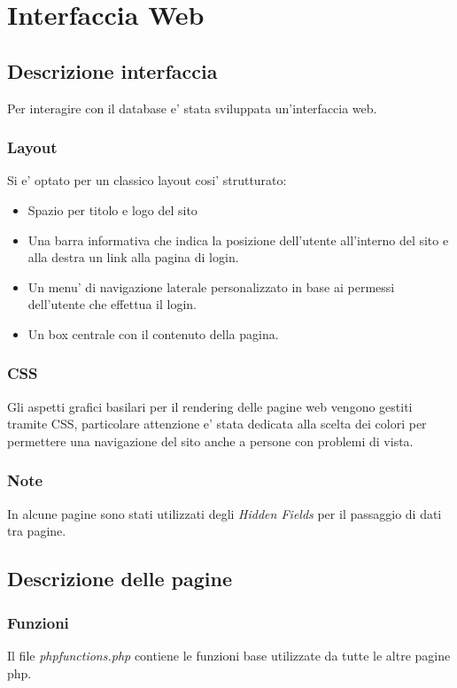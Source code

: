 \chapter{Interfaccia Web} 
 
\section{Descrizione interfaccia}

Per interagire con il database e' stata sviluppata un'interfaccia web.

\subsection{Layout}
Si e' optato per un classico layout cosi' strutturato:

\begin{itemize}
\item Spazio per titolo e logo del sito
\item Una barra informativa che indica la posizione dell'utente all'interno del sito e alla destra un link alla pagina di login.
\item Un menu' di navigazione laterale personalizzato in base ai permessi dell'utente che effettua il login.
\item Un box centrale con il contenuto della pagina.
\end{itemize}

\subsection{CSS}

Gli aspetti grafici basilari per il rendering delle pagine web vengono gestiti tramite CSS, particolare attenzione e' stata dedicata alla scelta dei colori per permettere una navigazione del sito anche a persone con problemi di vista.

\subsection{Note}
In alcune pagine sono stati utilizzati degli \textit{Hidden Fields} per il passaggio di dati tra pagine.

\section{Descrizione delle pagine}

\subsection{Funzioni}
Il file \textit{phpfunctions.php} contiene le funzioni base utilizzate da tutte le altre pagine php.

